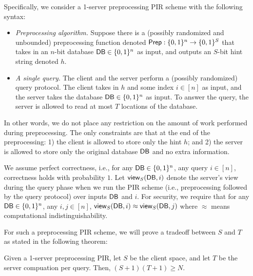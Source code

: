 Specifically, we consider a 1-server preprocessing PIR scheme 
with the following syntax:
\begin{itemize}[leftmargin=7mm]
\item {\it Preprocessing algorithm.}
Suppose there is a (possibly randomized and unbounded) %
preprocessing function denoted 
${\sf Prep} : \{0, 1\}^n \rightarrow \{0, 1\}^S$ 
that takes in an $n$-bit database ${\sf DB}\in\{0, 1\}^n$ as input,
and outputs an $S$-bit hint string denoted $h$.
\item 
{\it A single query.} 
The client and the server perform a (possibly randomized) query protocol.  
The client takes in $h$ and some index $i \in [n]$ as input, and the 
server takes 
the database ${\sf DB}\in \{0, 1\}^n$ as input. 
To answer the query, the server is allowed to read at most $T$ locations of the database. 
\end{itemize}
In other words, we do not place any restriction
on the amount of work performed
during preprocessing. The only constraints
are that at the end of the preprocessing: 
1) the client  
is allowed to store only the hint $h$; and 2) the server
is allowed to store only the original database ${\sf DB}$ and no extra information.

We assume perfect correctness, i.e., for any ${\sf DB} \in \{0, 1\}^n$, any query $i \in [n]$, 
correctness holds with probability $1$.
Let ${\sf view}_S({\sf DB}, i)$ 
denote the server's view during the query phase 
when we run the PIR scheme (i.e., preprocessing followed by the query protocol)
over inputs ${\sf DB}$ and $i$.
For security, we require 
that for any ${\sf DB} \in \{0, 1\}^n$, any $i, j \in [n]$,  
${\sf view}_S({\sf DB}, i) \approx {\sf view}_S({\sf DB}, j)$
where $\approx$ means computational indistinguishability.

For such a preprocessing PIR scheme, we will prove a tradeoff
between $S$ and $T$ as stated in the following theorem: 


\begin{theorem}
    Given a 1-server preprocessing PIR, 
        let $S$ be the client space, and let $T$ be the server compuation per query. 
    Then,  
    $(S+1)(T+1) \ge N$. 
\label{thm:lb}
\end{theorem}

